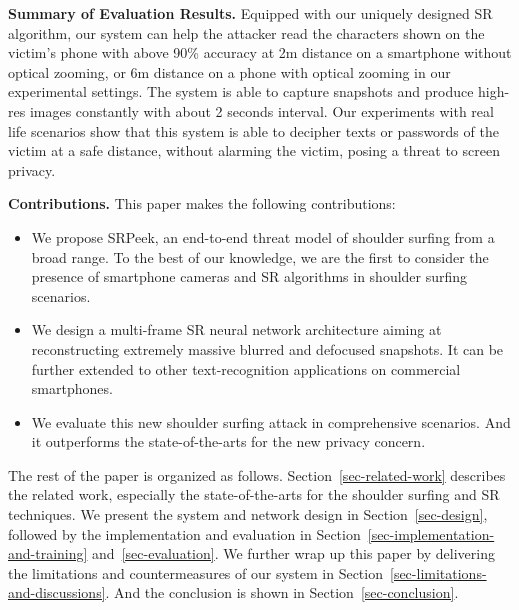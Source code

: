 \begin{itemize}[leftmargin=*]
\end{itemize}

\vspace{1mm}
\noindent
\textbf{Summary of Evaluation Results.}
Equipped with our uniquely designed SR algorithm, our system can help the attacker read the characters shown on the victim's phone with above 90\% accuracy at 2m distance on a smartphone without optical zooming, or 6m distance on a phone with optical zooming in our experimental settings. The system is able to capture snapshots and produce high-res images constantly with about 2 seconds interval. Our experiments with real life scenarios show that this system is able to decipher texts or passwords of the victim at a safe distance, without alarming the victim, posing a threat to screen privacy.

\vspace{1mm}
\noindent
\textbf{Contributions.} This paper makes the following contributions:
\begin{itemize}[leftmargin=*]
  \item	We propose \textsf{SRPeek}, an end-to-end threat model of shoulder surfing from a broad range. To the best of our knowledge, we are the first to consider the presence of smartphone cameras and SR algorithms in shoulder surfing scenarios.
  \item	We design a multi-frame SR neural network architecture aiming at reconstructing extremely massive blurred and defocused snapshots. It can be further extended to other text-recognition applications on commercial smartphones.
  \item	We evaluate this new shoulder surfing attack in comprehensive scenarios. And it outperforms the state-of-the-arts for the new privacy concern.
\end{itemize}

The rest of the paper is organized as follows. Section~\ref{sec-related-work} describes the related work, especially the state-of-the-arts for the shoulder surfing and SR techniques. We present the system and network design in Section~\ref{sec-design}, followed by the implementation and evaluation in Section~\ref{sec-implementation-and-training} and~\ref{sec-evaluation}. We further wrap up this paper by delivering the limitations and countermeasures of our system in Section~\ref{sec-limitations-and-discussions}. And the conclusion is shown in Section~\ref{sec-conclusion}.
